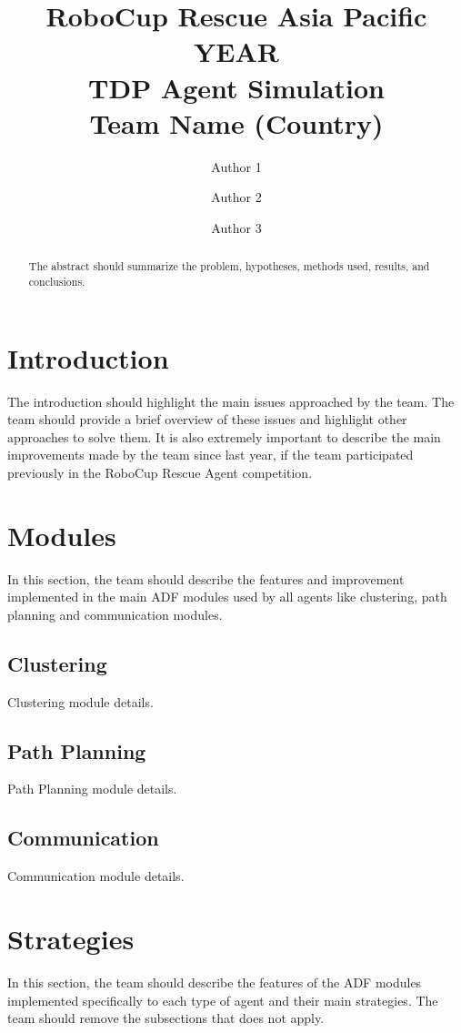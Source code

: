 \documentclass[runningheads,a4paper]{../llncs}
\begin{document}
\title{RoboCup Rescue Asia Pacific YEAR\\
       TDP Agent Simulation\\
       Team Name (Country)}
\author{Author 1 \and Author 2 \and Author 3}
\maketitle
\begin{abstract}
The abstract should summarize the problem, hypotheses, methods used, results, and conclusions.
\end{abstract}
\section{Introduction}
The introduction should highlight the main issues approached by the team. The
team should provide a brief overview of these issues and highlight other
approaches to solve them. It is also extremely important to describe the main
improvements made by the team since last year, if the team participated
previously in the RoboCup Rescue Agent competition.
\section{Modules}
In this section, the team should describe the features and improvement
implemented in the main ADF modules used by all agents like clustering, path
planning and communication modules.
\subsection{Clustering}
Clustering module details.
\subsection{Path Planning}
Path Planning module details.
\subsection{Communication}
Communication module details.
\section{Strategies}
In this section, the team should describe the features of the ADF modules
implemented specifically to each type of agent and their main strategies. The
team should remove the subsections that does not apply.
\end{document}
